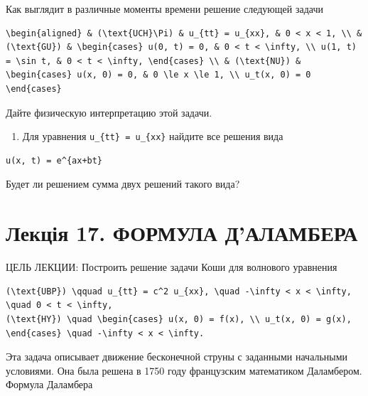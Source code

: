 \documentclass[
  ukrainian,
]{article}
\providecommand{\tightlist}{%
  \setlength{\itemsep}{0pt}\setlength{\parskip}{0pt}}
\begin{document}
Как выглядит в различные моменты времени решение следующей задачи

\begin{verbatim}
\begin{aligned} & (\text{UCH}\Pi) & u_{tt} = u_{xx}, & 0 < x < 1, \\ & (\text{GU}) & \begin{cases} u(0, t) = 0, & 0 < t < \infty, \\ u(1, t) = \sin t, & 0 < t < \infty, \end{cases} \\ & (\text{NU}) & \begin{cases} u(x, 0) = 0, & 0 \le x \le 1, \\ u_t(x, 0) = 0 \end{cases}
\end{verbatim}

Дайте физическую интерпретацию этой задачи.

\begin{enumerate}
\def\labelenumi{\arabic{enumi}.}
\setcounter{enumi}{3}
\tightlist
\item
  Для уравнения \texttt{u\_\{tt\}\ =\ u\_\{xx\}} найдите все решения
  вида
\end{enumerate}

\begin{verbatim}
u(x, t) = e^{ax+bt}
\end{verbatim}

Будет ли решением сумма двух решений такого вида?

\section{Лекція 17. ФОРМУЛА
Д'АЛАМБЕРА}\label{ux43bux435ux43aux446ux456ux44f-17.-ux444ux43eux440ux43cux443ux43bux430-ux434ux430ux43bux430ux43cux431ux435ux440ux430}

ЦЕЛЬ ЛЕКЦИИ: Построить решение задачи Коши для волнового уравнения

\begin{verbatim}
(\text{UBP}) \qquad u_{tt} = c^2 u_{xx}, \quad -\infty < x < \infty, \quad 0 < t < \infty,
(\text{HY}) \quad \begin{cases} u(x, 0) = f(x), \\ u_t(x, 0) = g(x), \end{cases} \quad -\infty < x < \infty.
\end{verbatim}

Эта задача описывает движение бесконечной струны с заданными начальными
условиями. Она была решена в 1750 году французским математиком
Даламбером. Формула Даламбера
\end{document}
